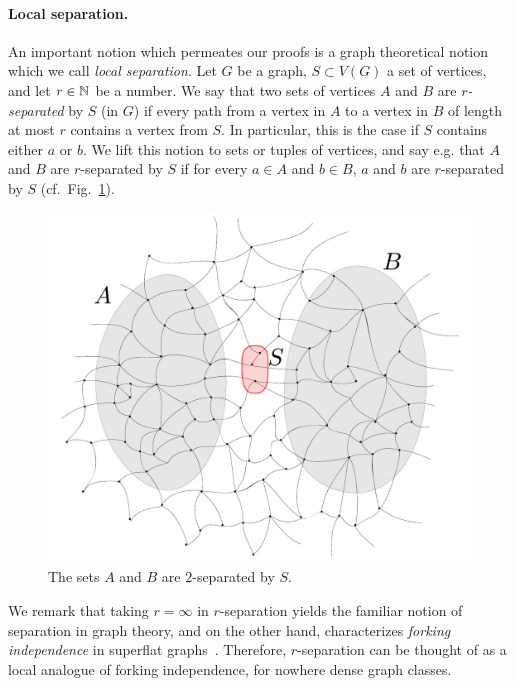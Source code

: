 \paragraph{Local separation.}
An important notion which permeates our proofs
is a graph theoretical notion which we call \emph{local separation}.
Let $G$ be a graph, $S\subset V(G)$ a set of vertices,
and let $r\in \mathbb{N}$ be a number. We say that two  sets of vertices $A$ and $B$  are \emph{$r$-separated} by $S$ (in $G$) if every path from a vertex in $A$ to a vertex in $B$
of length at most $r$ contains a vertex from $S$.
In particular, this is the case if $S$ contains either $a$ or $b$.
We lift this notion to sets or tuples of vertices,
and say e.g. that $A$ and $B$ are $r$-separated by $S$
if for every $a\in A$ and $b\in B$, $a$ and $b$ are $r$-separated by $S$
(cf.~Fig.~\ref{fig:sep}).
 \begin{figure}[h!]
 	\centering
 		\includegraphics[scale=0.35,page=1]{pics}
 	\caption{The sets $A$ and $B$ are $2$-separated by $S$.
 	}
 	\label{fig:sep}
 \end{figure}
We remark that taking $r=\infty$ in $r$-separation yields the familiar notion of separation in graph theory,
and on the other hand, characterizes \emph{forking independence} in superflat graphs~\cite{ivanov}. Therefore,
$r$-separation can be thought of as a local analogue of forking independence, for nowhere dense graph classes.

